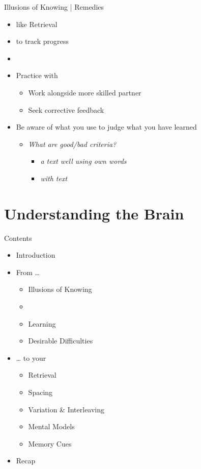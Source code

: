 \documentclass{ercisbeamer}
\begin{document}
\begin{frame}{Illusions of Knowing | Remedies}
    \begin{itemize}
        \item {} like Retrieval
        \item {} to track progress
        \item {}
        \item Practice with 
        \begin{itemize}
            \item Work alongside more skilled partner
            \item Seek corrective feedback
        \end{itemize}
        \item Be aware of what  you use to judge what you have learned
        \begin{itemize}
            \item \emph{What are good/bad criteria?} \pause
            \begin{itemize}
                \item \emph{ a text well using own words}
                \item \emph{ with text}
            \end{itemize}
        \end{itemize}
    \end{itemize}
\end{frame}

\section{Understanding the Brain}
\begin{frame}{Contents}
    \begin{itemize}
        \item Introduction
        \item From …
        \begin{itemize}
            \item Illusions of Knowing
            \item {}
            \item Learning
            \item Desirable Difficulties
        \end{itemize}
        \item … to your 
        \begin{itemize}
            \item Retrieval
            \item Spacing
            \item Variation \& Interleaving
            \item Mental Models
            \item Memory Cues
        \end{itemize}
        \item Recap
    \end{itemize}
\end{frame}
\end{document}

